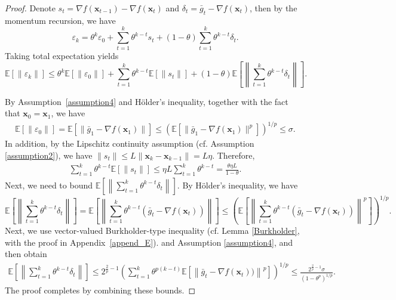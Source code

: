 \documentclass{article}
\newcommand{\bx}{\boldsymbol{x}}
\newcommand{\barg}{\bar{g}}
\theoremstyle{plain}
\theoremstyle{definition}
\theoremstyle{remark}
\begin{document}
\begin{proof}
Denote $s_t = \nabla f(\bx_{t-1}) - \nabla f(\bx_{t})$ and $\delta_t = \barg_t - \nabla f(\bx_t)$, then by the momentum recursion, we have
\begin{equation*}
   \varepsilon_k =  \theta^k \varepsilon_0 + \sum_{t=1}^k\theta^{k-t} s_t + (1-\theta) \sum_{t=1}^k\theta^{k-t} \delta_t.
\end{equation*}
Taking total expectation yields    
\begin{equation*}
\mathbb{E}\left[\|\varepsilon_k\|\right] \leq \theta^k \mathbb{E}[ \| \varepsilon_0\| ] 
   + \sum_{t=1}^k\theta^{k-t}\mathbb{E}[ \| s_t\|] + (1-\theta) \mathbb{E}\left[ \left\|\sum_{t=1}^k\theta^{k-t} \delta_t\right\|\right].
    \end{equation*}

By Assumption~\ref{assumption4} and Hölder's inequality, together with the fact that $\bx_0=\bx_1$, we have
\begin{align*}
   \mathbb{E}[\|\varepsilon_0\|] = \mathbb{E}[\|\barg_1-\nabla f(\bx_1)\|]  \leq \left(\mathbb{E}[\|\barg_1 -\nabla f(\bx_1)\|^p] \right)^{1/p} \leq \sigma.
\end{align*}
In addition, by the Lipschitz continuity assumption (cf. Assumption \ref{assumption2}), we have $\|s_t\|\leq L\|\bx_k-\bx_{k-1}\|=L\eta$. Therefore,
\begin{align*}
    \sum_{t=1}^k\theta^{k-t}\mathbb{E}[ \| s_t\|]  \leq  \eta L \sum_{t=1}^k\theta^{k-t} = \frac{\theta \eta L}{1-\theta} .
\end{align*}
Next, we need to bound $\mathbb{E}\left[\left\|\sum_{t=1}^k\theta^{k-t} \delta_t\right\|\right]$.
By Hölder's inequality, we have
\begin{equation*}
    \mathbb{E}\left[\left\|\sum_{t=1}^k\theta^{k-t} \delta_t\right\|\right]  = \mathbb{E}\left[\left\|\sum_{t=1}^k\theta^{k-t} (\barg_t-\nabla f(\bx_t))\right\|\right] 
     \leq \left(\mathbb{E}\left[\left\|\sum_{t=1}^k\theta^{k-t} \left(\barg_t-\nabla f(\bx_t)\right)\right\|^p\right] \right)^{1/p}.
\end{equation*}
Next, we use vector-valued Burkholder-type inequality (cf. Lemma \ref{Burkholder}, with the proof in Appendix~\ref{append_E}).
and Assumption \ref{assumption4}, and then obtain 
\begin{align*}
     \mathbb{E}\left[\left\|\sum_{t=1}^k\theta^{k-t} \delta_t\right\|\right]  \leq 2^{\frac{2}{p}-1}\left(\sum_{t=1}^k\theta^{p(k-t)}\mathbb{E}\left[\left\|\barg_t - \nabla f(\bx_t))\right\|^p\right] \right)^{1/p}   \leq \frac{2^{\frac{2}{p}-1} \sigma}{(1-\theta^p)^{1/p}}.
\end{align*}
The proof completes by combining these bounds. 
\end{proof}
\end{document}
